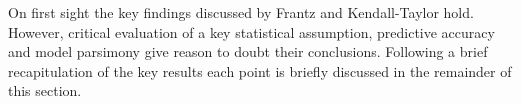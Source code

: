 On first sight the key findings discussed by Frantz and 
Kendall-Taylor hold. However, critical evaluation of a key
statistical assumption, predictive accuracy and model 
parsimony give reason to doubt their conclusions. Following 
a brief recapitulation of the key results each point is 
briefly discussed in the remainder of this section.


